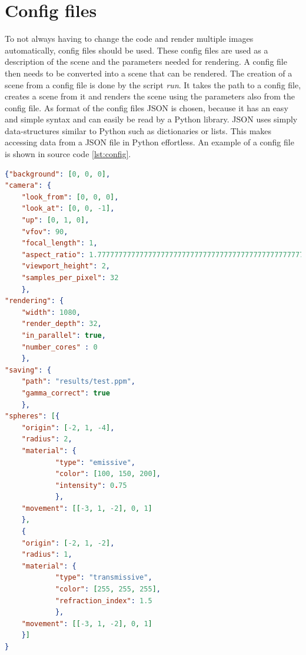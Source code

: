 \documentclass[12pt]{report}
\begin{document}
\chapter{Config files}
To not always having to change the code and render multiple images automatically, config files should be used. These config files are used as a description of the scene and the parameters needed for rendering. A config file then needs to be converted into a scene that can be rendered. The creation of a scene from a config file is done by the script \textit{run}. It takes the path to a config file, creates a scene from it and renders the scene using the parameters also from the config file. As format of the config files JSON is chosen, because it has an easy and simple syntax and can easily be read by a Python library. JSON uses simply data-structures similar to Python such as dictionaries or lists. This makes accessing data from a JSON file in Python effortless. An example of a config file is shown in source code \ref{lst:config}.
\begin{lstlisting}[caption={Config file example}, label=lst:config, language=json]
{"background": [0, 0, 0],
"camera": {
	"look_from": [0, 0, 0],
	"look_at": [0, 0, -1],
	"up": [0, 1, 0],
	"vfov": 90,
	"focal_length": 1,
	"aspect_ratio": 1.7777777777777777777777777777777777777777777777777777777777777777777777777777777777777777778,
	"viewport_height": 2,
	"samples_per_pixel": 32
	},
"rendering": {
	"width": 1080,
	"render_depth": 32,
	"in_parallel": true,
	"number_cores" : 0
	},
"saving": {
	"path": "results/test.ppm",
	"gamma_correct": true
	},
"spheres": [{
	"origin": [-2, 1, -4],
	"radius": 2,
	"material": {
			"type": "emissive",
			"color": [100, 150, 200],
			"intensity": 0.75
			},
	"movement": [[-3, 1, -2], 0, 1]
	},
	{
	"origin": [-2, 1, -2],
	"radius": 1,
	"material": {
			"type": "transmissive",
			"color": [255, 255, 255],
			"refraction_index": 1.5
			},
	"movement": [[-3, 1, -2], 0, 1]
	}]
}
\end{lstlisting}
\end{document}
